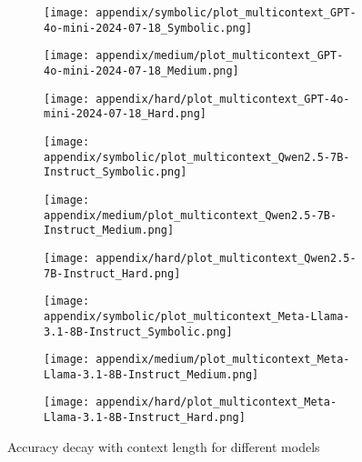 \begin{figure}[h!]
  \hfill
  \begin{subfigure}{0.17\textwidth}
    \texttt{[image: appendix/symbolic/plot\_multicontext\_GPT-4o-mini-2024-07-18\_Symbolic.png]}
  \end{subfigure}
  \hfill
  \begin{subfigure}{0.17\textwidth}
    \texttt{[image: appendix/medium/plot\_multicontext\_GPT-4o-mini-2024-07-18\_Medium.png]}
  \end{subfigure}
  \hfill
  \begin{subfigure}{0.17\textwidth}
    \texttt{[image: appendix/hard/plot\_multicontext\_GPT-4o-mini-2024-07-18\_Hard.png]}
  \end{subfigure}
  \hfill
  \begin{subfigure}{0.17\textwidth}
    \texttt{[image: appendix/symbolic/plot\_multicontext\_Qwen2.5-7B-Instruct\_Symbolic.png]}
  \end{subfigure}
  \hfill
  \begin{subfigure}{0.17\textwidth}
    \texttt{[image: appendix/medium/plot\_multicontext\_Qwen2.5-7B-Instruct\_Medium.png]}
  \end{subfigure}
  \hfill
  \begin{subfigure}{0.17\textwidth}
    \texttt{[image: appendix/hard/plot\_multicontext\_Qwen2.5-7B-Instruct\_Hard.png]}
  \end{subfigure}
  \hfill
  \begin{subfigure}{0.17\textwidth}
    \texttt{[image: appendix/symbolic/plot\_multicontext\_Meta-Llama-3.1-8B-Instruct\_Symbolic.png]}
  \end{subfigure}
  \hfill
  \begin{subfigure}{0.17\textwidth}
    \texttt{[image: appendix/medium/plot\_multicontext\_Meta-Llama-3.1-8B-Instruct\_Medium.png]}
  \end{subfigure}
  \hfill
  \begin{subfigure}{0.17\textwidth}
    \texttt{[image: appendix/hard/plot\_multicontext\_Meta-Llama-3.1-8B-Instruct\_Hard.png]}
  \end{subfigure}
  \caption{Accuracy decay with context length for different models}
\end{figure} 
